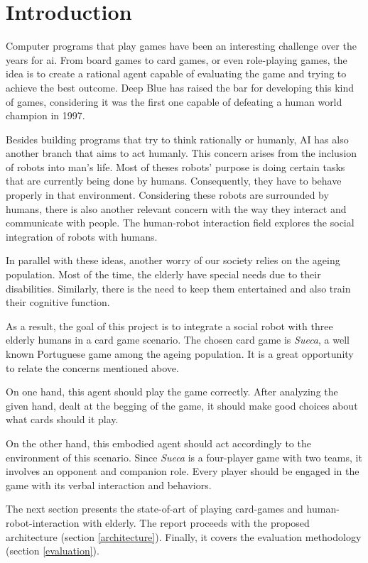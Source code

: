 \section{Introduction} \label{introduction}

Computer programs that play games have been an interesting challenge over the years for \gls{ai}. From board games to card games, or even role-playing games, the idea is to create a rational agent capable of evaluating the game and trying to achieve the best outcome. Deep Blue has raised the bar for developing this kind of games, considering it was the first one capable of defeating a human world champion in 1997.

Besides building programs that try to think rationally or humanly, AI has also another branch that aims to act humanly. This concern arises from the inclusion of robots into man's life. Most of theses robots' purpose is doing certain tasks that are currently being done by humans. Consequently, they have to behave properly in that environment. Considering these robots are surrounded by humans, there is also another relevant concern with the way they interact and communicate with people. The human-robot interaction field explores the social integration of robots with humans.

In parallel with these ideas, another worry of our society relies on the ageing population. Most of the time, the elderly have special needs due to their disabilities. Similarly, there is the need to keep them entertained and also train their cognitive function. 

As a result, the goal of this project is to integrate a social robot with three elderly humans in a card game scenario. The chosen card game is \emph{Sueca}, a well known Portuguese game among the ageing population. It is a great opportunity to relate the concerns mentioned above.

On one hand, this agent should play the game correctly. After analyzing the given hand, dealt at the begging of the game, it should make good choices about what cards should it play.

On the other hand, this embodied agent should act accordingly to the environment of this scenario. Since \emph{Sueca} is a four-player game with two teams, it involves an opponent and companion role. Every player should be engaged in the game with its verbal interaction and behaviors.


The next section presents the state-of-art of playing card-games and human-robot-interaction with elderly. The report proceeds with the proposed architecture (section \ref{architecture}). Finally, it covers the evaluation methodology (section \ref{evaluation}). 